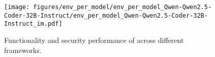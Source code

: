 
\begin{figure}[h]
    \centering
    \texttt{[image: figures/env\_per\_model/env\_per\_model\_Qwen-Qwen2.5-Coder-32B-Instruct/env\_per\_model\_Qwen-Qwen2.5-Coder-32B-Instruct\_im.pdf]}
    \caption{Functionality and security performance of \qwencoder{} across different frameworks.}
    \label{fig:env_per_model_Qwen-Qwen2.5-Coder-32B-Instruct}
\end{figure}
